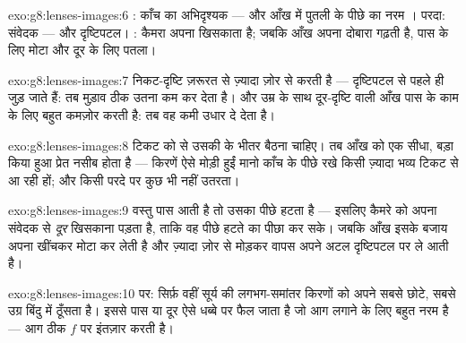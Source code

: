 \begin{solution}{exo:g8:lenses-images:6}
: काँच का अभिदृश्यक --- और आँख में पुतली के पीछे का नरम ।
परदा: संवेदक --- और दृष्टिपटल। : कैमरा अपना  खिसकाता है; जबकि
आँख अपना  दोबारा गढ़ती है, पास के लिए मोटा और दूर के लिए पतला।
\end{solution}

\begin{solution}{exo:g8:lenses-images:7}
निकट-दृष्टि ज़रूरत से ज़्यादा ज़ोर से  करती है --- 
दृष्टिपटल से पहले ही जुड़ जाते हैं: तब  मुड़ाव ठीक उतना कम
कर देता है। और उम्र के साथ दूर-दृष्टि वाली आँख पास के काम के लिए बहुत
कमज़ोर  करती है: तब  वह कमी उधार दे देता है।
\end{solution}

\begin{solution}{exo:g8:lenses-images:8}
टिकट को  से उसकी  के भीतर बैठना चाहिए। तब आँख को एक सीधा,
बड़ा किया हुआ प्रेत नसीब होता है --- किरणें ऐसे मोड़ी हुईं मानो काँच
के पीछे रखे किसी ज़्यादा भव्य टिकट से आ रही हों; और किसी परदे पर कुछ
भी नहीं उतरता।
\end{solution}

\begin{solution}{exo:g8:lenses-images:9}
वस्तु पास आती है तो उसका  पीछे हटता है --- इसलिए कैमरे को
अपना  संवेदक से \emph{दूर} खिसकाना पड़ता है, ताकि वह पीछे हटते
 का पीछा कर सके। जबकि आँख इसके बजाय अपना  खींचकर मोटा कर
लेती है और ज़्यादा ज़ोर से मोड़कर  वापस अपने अटल दृष्टिपटल पर
ले आती है।
\end{solution}

\begin{solution}{exo:g8:lenses-images:10}
 पर: सिर्फ़ वहीं  सूर्य की लगभग-समांतर किरणों को अपने
सबसे छोटे, सबसे उग्र बिंदु में ठूँसता है। इससे पास या दूर  ऐसे
धब्बे पर फैल जाता है जो आग लगाने के लिए बहुत नरम है --- आग ठीक $f$ पर
इंतज़ार करती है।
\end{solution}

